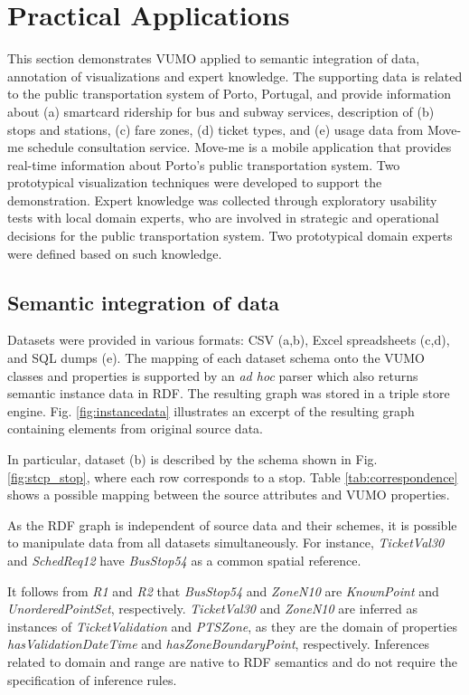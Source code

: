 \documentclass[]{interact}
\theoremstyle{plain}%
\theoremstyle{definition}
\theoremstyle{remark}
\theoremstyle{definition}
\begin{document}
\section{Practical Applications}
\label{sec:practical}

This section demonstrates VUMO applied to semantic integration of data, annotation of visualizations and expert knowledge. The supporting data is related to the public transportation system of Porto, Portugal, and provide information about (a) smartcard ridership for bus and subway services, description of (b) stops and stations, (c) fare zones, (d) ticket types, and (e) usage data from Move-me schedule consultation service. Move-me is a mobile application that provides real-time information about Porto's public transportation system. Two prototypical visualization techniques were developed to support the demonstration. Expert knowledge was collected through exploratory usability tests with local domain experts, who are involved in strategic and operational decisions for the public transportation system. Two prototypical domain experts were defined based on such knowledge.

\subsection{Semantic integration of data}

Datasets were provided in various formats: CSV (a,b), Excel spreadsheets (c,d), and SQL dumps (e). The mapping of each dataset schema onto the VUMO classes and properties is supported by an \textit{ad hoc} parser which also returns semantic instance data in RDF. The resulting graph was stored in a triple store engine. Fig. \ref{fig:instancedata} illustrates an excerpt of the resulting graph containing elements from original source data.

In particular, dataset (b) is described by the schema shown in Fig. \ref{fig:stcp_stop}, where each row corresponds to a stop. Table \ref{tab:correspondence} shows a possible mapping between the source attributes and VUMO properties.

As the RDF graph is independent of source data and their schemes, it is possible to manipulate data from all datasets simultaneously. For instance, \textit{TicketVal30} and \textit{SchedReq12} have \textit{BusStop54} as a common spatial reference.

It follows from \textit{R1} and \textit{R2} that \textit{BusStop54} and \textit{ZoneN10} are \textit{KnownPoint} and \textit{UnorderedPointSet}, respectively. \textit{TicketVal30} and \textit{ZoneN10} are inferred as instances of \textit{TicketValidation} and \textit{PTSZone}, as they are the domain of properties \textit{hasValidationDateTime} and \textit{hasZoneBoundaryPoint}, respectively. Inferences related to domain and range are native to RDF semantics and do not require the specification of inference rules.
\end{document}
